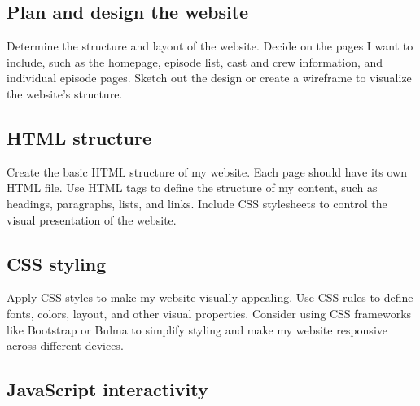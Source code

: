 \documentclass{article}
\begin{document}
\subsection{Plan and design the website}

Determine the structure and layout of the website. Decide on the pages I want to include, such as the homepage, episode list, cast and crew information, and individual episode pages. Sketch out the design or create a wireframe to visualize the website's structure.

\subsection{HTML structure}

Create the basic HTML structure of my website. Each page should have its own HTML file. Use HTML tags to define the structure of my content, such as headings, paragraphs, lists, and links. Include CSS stylesheets to control the visual presentation of the website.

\subsection{CSS styling}

Apply CSS styles to make my website visually appealing. Use CSS rules to define fonts, colors, layout, and other visual properties. Consider using CSS frameworks like Bootstrap or Bulma to simplify styling and make my website responsive across different devices.

\subsection{JavaScript interactivity}
\end{document}
